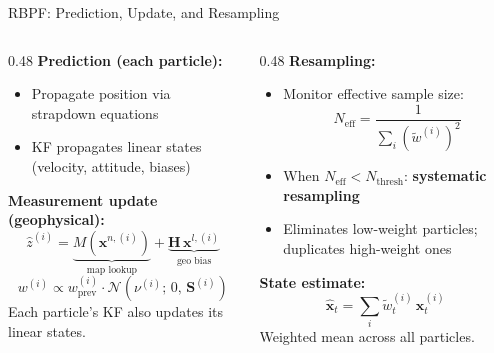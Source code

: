 \documentclass[aspectratio=169]{beamer}
\begin{document}
\begin{frame}{RBPF: Prediction, Update, and Resampling}
    \begin{columns}
        \begin{column}{0.48\textwidth}
            \textbf{Prediction (each particle):}
            \begin{itemize}
                \item Propagate position via strapdown equations
                \item KF propagates linear states (velocity, attitude, biases)
            \end{itemize}

            \vspace{0.5em}
            \textbf{Measurement update (geophysical):}
            \[
            \hat{z}^{(i)} = \underbrace{M(\mathbf{x}^{n,(i)})}_{\text{map lookup}} + \underbrace{\mathbf{H}\,\mathbf{x}^{l,(i)}}_{\text{geo bias}}
            \]
            \[
            w^{(i)} \propto w^{(i)}_\text{prev} \cdot \mathcal{N}\!\left(\nu^{(i)};\, 0,\, \mathbf{S}^{(i)}\right)
            \]
            Each particle's KF also updates its linear states.
        \end{column}
        \begin{column}{0.48\textwidth}
            \textbf{Resampling:}
            \begin{itemize}
                \item Monitor effective sample size:
                \[
                N_\text{eff} = \frac{1}{\sum_i (\tilde{w}^{(i)})^2}
                \]
                \item When $N_\text{eff} < N_\text{thresh}$: \textbf{systematic resampling}
                \item Eliminates low-weight particles; duplicates high-weight ones
            \end{itemize}

            \vspace{0.4em}
            \textbf{State estimate:}
            \[
            \hat{\mathbf{x}}_t = \sum_i \tilde{w}^{(i)}_t\, \mathbf{x}^{(i)}_t
            \]
            Weighted mean across all particles.
        \end{column}
    \end{columns}
\end{frame}
\end{document}
